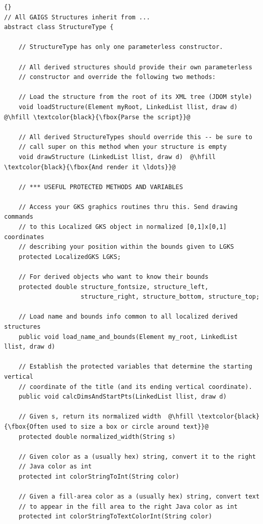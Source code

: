 \documentclass[11pt,letterpaper]{book}
\begin{document}
\begin{lstlisting}{}
// All GAIGS Structures inherit from ...
abstract class StructureType {

    // StructureType has only one parameterless constructor.

    // All derived structures should provide their own parameterless
    // constructor and override the following two methods:
    
    // Load the structure from the root of its XML tree (JDOM style)
    void loadStructure(Element myRoot, LinkedList llist, draw d)  @\hfill \textcolor{black}{\fbox{Parse the script}}@

    // All derived StructureTypes should override this -- be sure to
    // call super on this method when your structure is empty
    void drawStructure (LinkedList llist, draw d)  @\hfill \textcolor{black}{\fbox{And render it \ldots}}@

    // *** USEFUL PROTECTED METHODS AND VARIABLES

    // Access your GKS graphics routines thru this. Send drawing commands
    // to this Localized GKS object in normalized [0,1]x[0,1] coordinates
    // describing your position within the bounds given to LGKS 
    protected LocalizedGKS LGKS;

    // For derived objects who want to know their bounds
    protected double structure_fontsize, structure_left, 
                     structure_right, structure_bottom, structure_top;

    // Load name and bounds info common to all localized derived structures
    public void load_name_and_bounds(Element my_root, LinkedList llist, draw d) 

    // Establish the protected variables that determine the starting vertical 
    // coordinate of the title (and its ending vertical coordinate).  
    public void calcDimsAndStartPts(LinkedList llist, draw d) 

    // Given s, return its normalized width  @\hfill \textcolor{black}{\fbox{Often used to size a box or circle around text}}@
    protected double normalized_width(String s) 

    // Given color as a (usually hex) string, convert it to the right
    // Java color as int
    protected int colorStringToInt(String color) 

    // Given a fill-area color as a (usually hex) string, convert text
    // to appear in the fill area to the right Java color as int
    protected int colorStringToTextColorInt(String color) 
\end{lstlisting}
\end{document}
